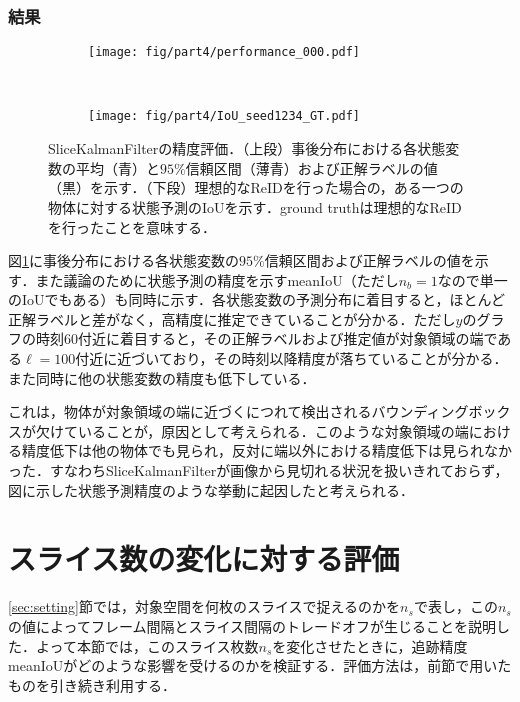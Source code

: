         \subsubsection{結果}

        \begin{figure}[t]
            \begin{subfigure}[t]{\linewidth}
                \centering
                \texttt{[image: fig/part4/performance\_000.pdf]}
            \end{subfigure}
            \\
            \begin{subfigure}[t]{\linewidth}
                \centering
                \texttt{[image: fig/part4/IoU\_seed1234\_GT.pdf]}
            \end{subfigure}
            \caption[SliceKalmanFilterの精度評価]{SliceKalmanFilterの精度評価．（上段）事後分布における各状態変数の平均（青）と$95\%$信頼区間（薄青）および正解ラベルの値（黒）を示す．（下段）理想的なReIDを行った場合の，ある一つの物体に対する状態予測のIoUを示す．ground truthは理想的なReIDを行ったことを意味する．}
            \label{fig:SKF_evaluation}
        \end{figure}

        図\ref{fig:SKF_evaluation}に事後分布における各状態変数の$95\%$信頼区間および正解ラベルの値を示す．また議論のために状態予測の精度を示すmeanIoU（ただし$n_b = 1$なので単一のIoUでもある）も同時に示す．各状態変数の予測分布に着目すると，ほとんど正解ラベルと差がなく，高精度に推定できていることが分かる．ただし$y$のグラフの時刻$60$付近に着目すると，その正解ラベルおよび推定値が対象領域の端である$\ell = 100$付近に近づいており，その時刻以降精度が落ちていることが分かる．また同時に他の状態変数の精度も低下している．

        これは，物体が対象領域の端に近づくにつれて検出されるバウンディングボックスが欠けていることが，原因として考えられる．このような対象領域の端における精度低下は他の物体でも見られ，反対に端以外における精度低下は見られなかった．すなわちSliceKalmanFilterが画像から見切れる状況を扱いきれておらず，図に示した状態予測精度のような挙動に起因したと考えられる．

\section{スライス数の変化に対する評価}
\label{sec:number_of_slice_effect}

\ref{sec:setting}節では，対象空間を何枚のスライスで捉えるのかを$n_s$で表し，この$n_s$の値によってフレーム間隔とスライス間隔のトレードオフが生じることを説明した．よって本節では，このスライス枚数$n_s$を変化させたときに，追跡精度meanIoUがどのような影響を受けるのかを検証する．評価方法は，前節で用いたものを引き続き利用する．


